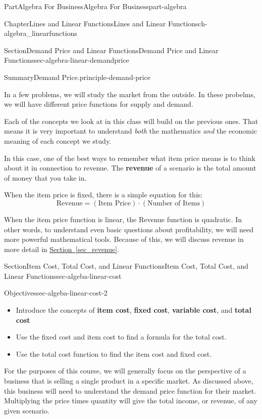 \documentclass[oneside,10pt,]{tufte-book}
\newcommand{\xreffont}{\relax}
\newcommand{\terminology}[1]{\textbf{#1}}
\numberwithin{equation}{chapter}
\begin{document}
\begin{partptx}{Part}{Algebra For Business}{}{Algebra For Business}{}{}{part-algebra}
\begin{chapterptx}{Chapter}{Lines and Linear Functions}{}{Lines and Linear Functions}{}{}{ch-algebra_linearfunctions}
\begin{sectionptx}{Section}{Demand Price and Linear Functions}{}{Demand Price and Linear Functions}{}{}{sec-algebra-linear-demandprice}
\begin{assemblage}{Summary}{Demand Price.}{principle-demand-price}
\begin{itemize}[label=\textbullet]
\par
In a few problems, we will study the market from the outside.  In these probelms, we will have different price functions for supply and demand.%
\end{itemize}
%
\end{assemblage}
Each of the concepts we look at in this class will build on the previous ones.  That means it is very important to understand \emph{both} the mathematics \emph{and} the economic meaning of each concept we study.%
\par
In this case, one of the best ways to remember what item price means is to think about it in connection to revenue. The \terminology{revenue} of a scenario is the total amount of money that you take in.%
\par
When the item price is fixed, there is a simple equation for this:%
\begin{equation*}
\text{Revenue} = (\text{Item Price})\cdot(\text{Number of Items})
\end{equation*}
%
\par
When the item price function is linear, the Revenue function is quadratic. In other words, to understand even basic questions about profitability, we will need more powerful mathematical tools. Because of this, we will discuss revenue in more detail in \hyperref[sec_revenue]{Section~{\xreffont\ref{sec_revenue}}}.%
\end{sectionptx}
%
%
\typeout{************************************************}
\typeout{************************************************}
%
\begin{sectionptx}{Section}{Item Cost, Total Cost, and Linear Functions}{}{Item Cost, Total Cost, and Linear Functions}{}{}{sec-algeba-linear-cost}
\begin{objectives}{Objectives}{sec-algeba-linear-cost-2}
%
\begin{itemize}[label=\textbullet]
\item{}Introduce the concepts of \terminology{item cost}, \terminology{fixed cost}, \terminology{variable cost}, and \terminology{total cost}%
\item{}Use the fixed cost and item cost to find a formula for the total cost.%
\item{}Use the total cost function to find the item cost and fixed cost.%
\end{itemize}
\end{objectives}
For the purposes of this course, we will generally focus on the perspective of a business that is selling a single product in a specific market. As discussed above, this business will need to understand the demand price function for their market. Multiplying the price times quantity will give the total income, or revenue, of any given scenario.%

\end{sectionptx}
\end{chapterptx}
\end{partptx}
\end{document}
